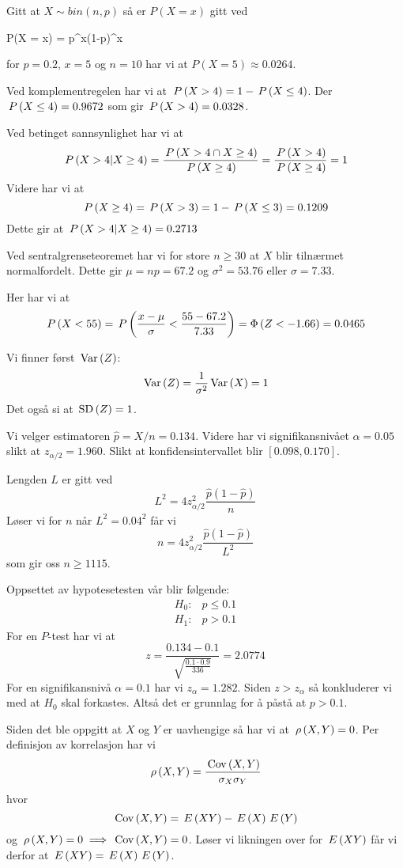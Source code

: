 \oppgave
\deloppgave
Gitt at $X \sim bin(n, p)$ så er $P(X = x)$ gitt ved
\begin{likning}
	P(X = x) = p^x(1-p)^x
\end{likning}
for $p = 0.2$, $x = 5$ og $n = 10$ har vi at $P(X = 5) \approx 0.0264$.

\deloppgave
Ved komplementregelen har vi at $\,P\left(X > 4\right) = 1 - \,P\left(X \leq 4\right)$. Der $\,P\left(X \leq 4\right) = 0.9672$ som gir $\,P\left(X > 4\right) = 0.0328$.

\deloppgave
Ved betinget sannsynlighet har vi at
$$
\,P\left(X > 4 | X \geq 4\right) = \frac{\,P\left(X > 4 \cap X \geq 4\right)}{\,P\left(X \geq 4\right)} = \frac{\,P\left(X > 4\right)}{\,P\left(X \geq 4\right)} = 1
$$
Videre har vi at 
$$
\,P\left(X \geq 4\right) = \,P\left(X > 3\right) = 1 - \,P\left(X \leq 3\right) = 0.1209
$$
Dette gir at $\,P\left(X > 4 | X \geq 4\right) = 0.2713$

\deloppgave
Ved sentralgrenseteoremet har vi for store $n \geq 30$ at $X$ blir tilnærmet normalfordelt. Dette gir $\mu = np = 67.2$ og $\sigma^2 = 53.76$ eller $\sigma = 7.33$.

\deloppgave
Her har vi at
$$
\,P\left(X < 55\right) = \,P\left(\frac{x - \mu}{\sigma} < \frac{55-67.2}{7.33}\right) = \Phi\left(Z < -1.66\right) = 0.0465
$$

\deloppgave
Vi finner først $\, \mathrm{Var}\left(Z\right)$:
$$
\, \mathrm{Var}\left(Z\right) = \frac{1}{\sigma^2}\, \mathrm{Var}\left(X\right) = 1
$$
Det også si at $\,\mathrm{SD}\left(Z\right) = 1$.

\deloppgave
Vi velger estimatoren $\hat{p} = X/n = 0.134$. Videre har vi signifikansnivået $\alpha = 0.05$ slikt at $z_{\alpha/2} = 1.960$. Slikt at konfidensintervallet blir $\left[0.098, 0.170\right]$.

\deloppgave
Lengden $L$ er gitt ved
$$
L^2 = 4z_{\alpha/2}^2\frac{\hat{p}(1-\hat{p})}{n}
$$
Løser vi for $n$ når $L^2 = 0.04^2$ får vi
$$
n = 4z_{\alpha/2}^2\frac{\hat{p}(1-\hat{p})}{L^2}
$$
som gir oss $n \geq 1115$.

\deloppgave
Oppsettet av hypotesetesten vår blir følgende:
\begin{align*}
	H_0\colon & p \leq 0.1\\
	H_1\colon & p > 0.1
\end{align*}
For en $P$-test har vi at
$$
z = \frac{0.134 - 0.1}{\sqrt{\frac{0.1\cdot0.9}{336}}} = 2.0774
$$
For en signifikansnivå $\alpha = 0.1$ har vi $z_\alpha = 1.282$. Siden $z > z_\alpha$ så konkluderer vi med at $H_0$ skal forkastes. Altså det er grunnlag for å påstå at $p > 0.1$.

\oppgave
Siden det ble oppgitt at $X$ og $Y$ er uavhengige så har vi at $\,\rho\left(X, Y\right) = 0$. Per definisjon av korrelasjon har vi
$$
\,\rho\left(X, Y\right) = \frac{\,\mathrm{Cov}\left(X, Y\right)}{\sigma_X\sigma_Y}
$$
hvor
$$
\,\mathrm{Cov}\left(X, Y\right) = \,E\left(XY\right) - \,E\left(X\right)\,E\left(Y\right)
$$
og $\,\rho\left(X, Y\right) = 0 \implies \,\mathrm{Cov}\left(X, Y\right) = 0$. Løser vi likningen over for $\,E\left(XY\right)$ får vi derfor at $\,E\left(XY\right) = \,E\left(X\right)\,E\left(Y\right)$.


